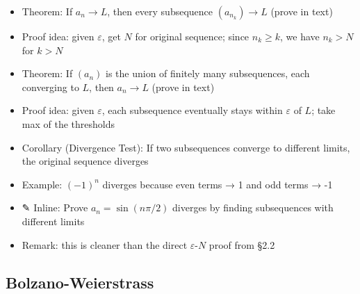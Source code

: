 \documentclass[
  10pt,
  letterpaper,
]{scrbook}
\providecommand{\tightlist}{%
  \setlength{\itemsep}{0pt}\setlength{\parskip}{0pt}}
\begin{document}
\begin{itemize}
\tightlist
\item
  Theorem: If \(a_n \to L\), then every subsequence \((a_{n_k}) \to L\)
  (prove in text)
\item
  Proof idea: given \(\varepsilon\), get \(N\) for original sequence;
  since \(n_k \geq k\), we have \(n_k > N\) for \(k > N\)
\item
  Theorem: If \((a_n)\) is the union of finitely many subsequences, each
  converging to \(L\), then \(a_n \to L\) (prove in text)
\item
  Proof idea: given \(\varepsilon\), each subsequence eventually stays
  within \(\varepsilon\) of \(L\); take max of the thresholds
\item
  Corollary (Divergence Test): If two subsequences converge to different
  limits, the original sequence diverges
\item
  Example: \((-1)^n\) diverges because even terms → 1 and odd terms → -1
\item
  ✎ Inline: Prove \(a_n = \sin(n\pi/2)\) diverges by finding
  subsequences with different limits
\item
  Remark: this is cleaner than the direct \(\varepsilon\)-\(N\) proof
  from §2.2
\end{itemize}

\subsection{Bolzano-Weierstrass}\label{bolzano-weierstrass}
\end{document}
